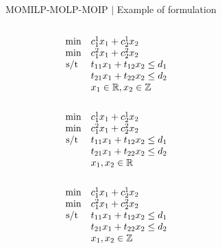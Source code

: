 \documentclass[10pt,xcolor=dvipsnames]{beamer}
\newcommand{\mR}{\mathbb{R}}
\newcommand{\mZ}{\mathbb{Z}}
\begin{document}
%
% 
\begin{frame}[fragile=singleslide]{MOMILP-MOLP-MOIP $\mid$ Example of formulation}

{\small
\begin{columns}
\begin{column}{0.33\textwidth}
$$
\begin{array}{rlcl}
\min          & c^1_1x_1+c^1_2x_2\\
\min          & c^2_1x_1+c^2_2x_2\\
\hbox{s/t } &  t_{11}x_1+t_{12}x_2  \leq  d_1\\
                 &  t_{21}x_1+t_{22}x_2  \leq  d_2\\
                 & x_1  \in \mR, x_2 \in \mZ\\
\notag
\end{array}
$$
$$
\begin{array}{rlcl}
\min          & c^1_1x_1+c^1_2x_2\\
\min          & c^2_1x_1+c^2_2x_2\\
\hbox{s/t } &  t_{11}x_1+t_{12}x_2  \leq  d_1\\
                 &  t_{21}x_1+t_{22}x_2  \leq  d_2\\
                 & x_1, x_2  \in \mR\\
\notag
\end{array}
$$
$$
\begin{array}{rlcl}
\min          & c^1_1x_1+c^1_2x_2\\
\min          & c^2_1x_1+c^2_2x_2\\
\hbox{s/t } &  t_{11}x_1+t_{12}x_2  \leq  d_1\\
                 &  t_{21}x_1+t_{22}x_2  \leq  d_2\\
                 & x_1, x_2 \in \mZ\\
\notag
\end{array}
$$
\end{column}

\begin{column}{0.66\textwidth}


\end{column}
\end{columns}}
\end{frame}
\end{document}
